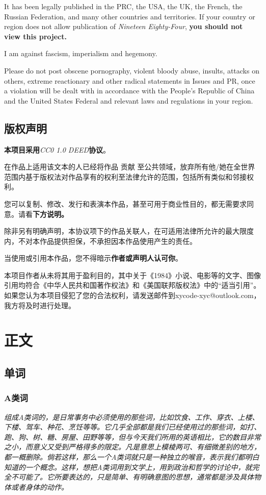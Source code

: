 \documentclass[lang=cn, color=black]{elegantbook}
\begin{document}
                It has been legally published in the PRC, the USA, the UK, the French, the Russian Federation, and many other countries and territories. If your country or region does not allow publication of \textit{Nineteen Eighty-Four}, \textbf{you should not view this project.}

                I am against fascism, imperialism and hegemony.

                Please do not post obscene pornography, violent bloody abuse, insults, attacks on others, extreme reactionary and other radical statements in Issues and PR, once a violation will be dealt with in accordance with the People's Republic of China and the United States Federal and relevant laws and regulations in your region.
    
        \chapter*{版权声明}
            \begin{center}
                \large
                \textbf{本项目采用}\textit{CC0 1.0 DEED}\textbf{协议}。
            \end{center}

            在作品上适用该文本的人已经将作品 贡献 至公共领域，放弃所有他/她在全世界范围内基于版权法对作品享有的权利至法律允许的范围，包括所有类似和邻接权利。

            您可以复制、修改、发行和表演本作品，甚至可用于商业性目的，都无需要求同意。请看\textbf{下方说明。}

            除非另有明确声明，本协议项下的作品关联人，在可适用法律所允许的最大限度内，不对本作品提供担保，不承担因本作品使用产生的责任。

            当使用或引用本作品，您不得暗示\textbf{作者或声明人认可你}。

            本项目作者从未将其用于盈利目的，其中关于《1984》小说、电影等的文字、图像引用均符合《中华人民共和国著作权法》和《美国联邦版权法》中的“适当引用”。如果您认为本项目侵犯了您的合法权利，请发送邮件到xycode-xyc@outlook.com，我方将及时进行处理。
        
    \part{正文}
        \chapter{单词}
            \section{A类词}
                \textit{
                    组成A类词的，是日常事务中必须使用的那些词，比如饮食、工作、穿衣、上楼、下楼、驾车、种花、烹饪等等。它几乎全部都是我们已经使用过的那些词，如打、跑、狗、树、糖、房屋、田野等等，但与今天我们所用的英语相比，它的数目非常之小，而意义又受到严格得多的限定。凡是意思上模棱两可、有细微差别的地方，都一概删除。倘若这样，那么一个A类词就只是一种独立的喉音，表示我们都明白知道的一个概念。这样，想把A类词用到文学上，用到政治和哲学的讨论中，就完全不可能了。它所要表达的，只是简单、有明确意图的思想，通常都是涉及具体物体或者身体的动作。
                }
\end{document}
